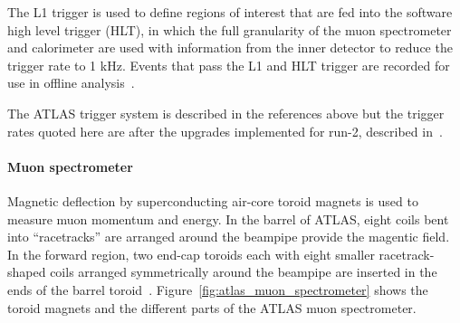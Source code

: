 
The L1 trigger is used to define regions of interest that are fed into the software high level trigger (HLT), in which the full granularity of the muon spectrometer and calorimeter are used with information from the inner detector to reduce the trigger rate to 1 kHz. Events that pass the L1 and HLT trigger are recorded for use in offline analysis~\cite{atlas_hlt_trigger_tdr}.

The ATLAS trigger system is described in the references above but the trigger rates quoted here are after the upgrades implemented for run-2, described in~\cite{martinez_run-2_2016}.

\paragraph*{Muon spectrometer} \hfill \break
Magnetic deflection by superconducting air-core toroid magnets is used to measure muon momentum and energy. In the barrel of ATLAS, eight coils bent into ``racetracks'' are arranged around the beampipe provide the magentic field. In the forward region, two end-cap toroids each with eight smaller racetrack-shaped coils arranged symmetrically around the beampipe are inserted in the ends of the barrel toroid~\cite{atlas_magnet_tdr}. Figure~\ref{fig:atlas_muon_spectrometer} shows the toroid magnets and the different parts of the ATLAS muon spectrometer.

